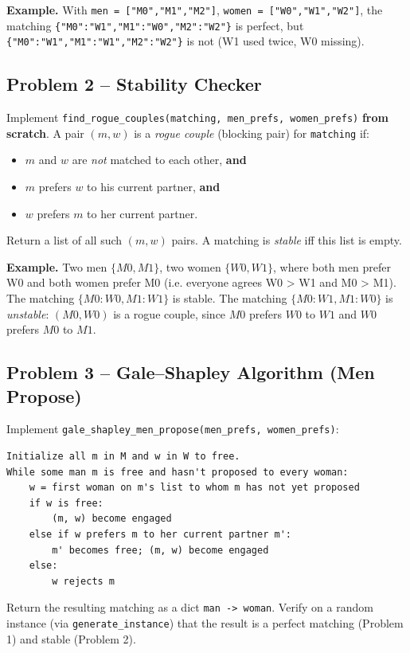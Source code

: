 \documentclass[11pt]{article}
\begin{document}
\textbf{Example.} With \texttt{men = ["M0","M1","M2"]}, \texttt{women =
["W0","W1","W2"]}, the matching \texttt{\{"M0":"W1","M1":"W0","M2":"W2"\}} is perfect, but
\texttt{\{"M0":"W1","M1":"W1","M2":"W2"\}} is not (W1 used twice, W0 missing).

\subsection*{Problem 2 -- Stability Checker}

Implement \texttt{find\_rogue\_couples(matching, men\_prefs, women\_prefs)}
\textbf{from scratch}. A pair $(m, w)$ is a \emph{rogue couple} (blocking pair) for
\texttt{matching} if:
\begin{itemize}
    \item $m$ and $w$ are \emph{not} matched to each other, \textbf{and}
    \item $m$ prefers $w$ to his current partner, \textbf{and}
    \item $w$ prefers $m$ to her current partner.
\end{itemize}
Return a list of all such $(m,w)$ pairs. A matching is \emph{stable} iff this list is
empty.

\textbf{Example.} Two men $\{M0, M1\}$, two women $\{W0, W1\}$, where both men prefer W0
and both women prefer M0 (i.e. everyone agrees W0 > W1 and M0 > M1). The matching
$\{M0{:}W0, M1{:}W1\}$ is stable. The matching $\{M0{:}W1, M1{:}W0\}$ is \emph{unstable}:
$(M0, W0)$ is a rogue couple, since $M0$ prefers $W0$ to $W1$ and $W0$ prefers $M0$ to
$M1$.

\subsection*{Problem 3 -- Gale--Shapley Algorithm (Men Propose)}

Implement \texttt{gale\_shapley\_men\_propose(men\_prefs, women\_prefs)}:
\begin{verbatim}
Initialize all m in M and w in W to free.
While some man m is free and hasn't proposed to every woman:
    w = first woman on m's list to whom m has not yet proposed
    if w is free:
        (m, w) become engaged
    else if w prefers m to her current partner m':
        m' becomes free; (m, w) become engaged
    else:
        w rejects m
\end{verbatim}
Return the resulting matching as a dict \texttt{man -> woman}. Verify on a random
instance (via \texttt{generate\_instance}) that the result is a perfect matching
(Problem 1) and stable (Problem 2).
\end{document}
